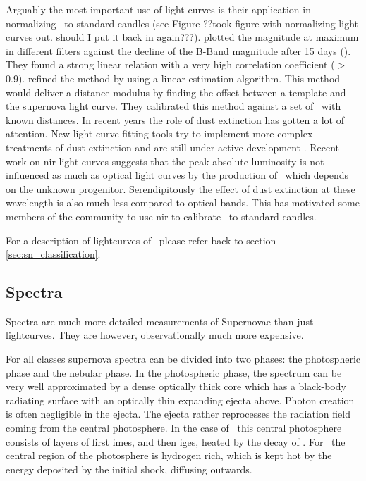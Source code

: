 Arguably the most important use of light curves is their application in normalizing \sneia\ to standard candles (see Figure ??took figure with normalizing light curves out. should I put it back in again???). \citet[][]{1993ApJ...413L.105P} plotted the magnitude at maximum in different filters against the decline of the B-Band magnitude after 15 days (\dmb).  They found a strong linear relation with a very high correlation coefficient ($>$ 0.9). \cite{1995ApJ...438L..17R} refined the method by using a linear estimation algorithm. This method would deliver a distance modulus by finding the offset between a template and the supernova light curve. They calibrated this method against a set of \sneia\ with known distances. In recent years the role of dust extinction has gotten a lot of attention. New light curve fitting tools try to implement more complex treatments of dust extinction and are still under active development \cite[e.g.][]{2007ApJ...659..122J, 2007A&A...466...11G}. Recent work on \gls{nir} light curves \citep{2006ApJ...649..939K} suggests that the peak absolute luminosity is not influenced as much as optical light curves by the production of \Ni\ which depends on the unknown progenitor. Serendipitously the effect of dust extinction at these wavelength is also much less compared to optical bands. This has motivated some members of the community \citep[e.g.][]{2011ApJ...731..120M} to use \gls{nir} to calibrate \sneia\ to standard candles.

For a description of lightcurves of \sneii\ please refer back to section \ref{sec:sn_classification}.


\subsection{Spectra} 
\label{sec:intro_sn_spectra}
Spectra are much more detailed measurements of Supernovae than just lightcurves. They are however, observationally much more expensive. 

For all classes supernova spectra can be divided into two phases: the photospheric phase and the nebular phase. In the photospheric phase, the spectrum can be very well approximated by a dense optically thick core which has a black-body radiating surface with an optically thin expanding ejecta above. Photon creation is often negligible in the ejecta. The ejecta rather reprocesses the radiation field coming from the central photosphere. In the case of \sneia\ this central photosphere consists of layers of first \glspl{ime}, and then \glspl{ige}, heated by the decay of \Ni. For \sneii\ the central region of the photosphere is hydrogen rich, which is kept hot by the energy deposited by the initial shock, diffusing outwards. 

